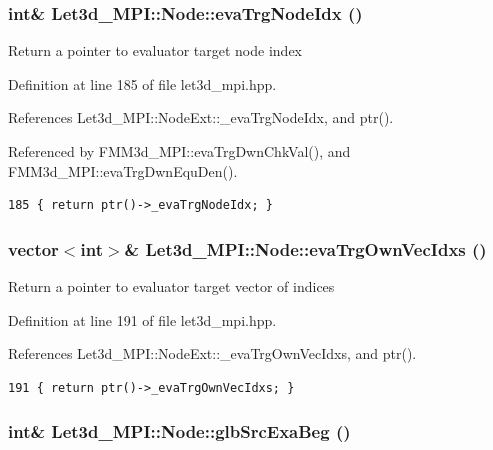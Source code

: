 \subsubsection{\setlength{\rightskip}{0pt plus 5cm}int\& Let3d\_\-MPI::Node::eva\-Trg\-Node\-Idx ()\hspace{0.3cm}{\tt  [inline]}}\label{classLet3d__MPI_1_1Node_b1477eecec8df181ec0697652f7729de_b1477eecec8df181ec0697652f7729de}


Return a pointer to evaluator target node index 

Definition at line 185 of file let3d\_\-mpi.hpp.

References Let3d\_\-MPI::Node\-Ext::\_\-eva\-Trg\-Node\-Idx, and ptr().

Referenced by FMM3d\_\-MPI::eva\-Trg\-Dwn\-Chk\-Val(), and FMM3d\_\-MPI::eva\-Trg\-Dwn\-Equ\-Den().

\footnotesize\begin{verbatim}185 { return ptr()->_evaTrgNodeIdx; }
\end{verbatim}\normalsize 


\subsubsection{\setlength{\rightskip}{0pt plus 5cm}vector$<$int$>$\& Let3d\_\-MPI::Node::eva\-Trg\-Own\-Vec\-Idxs ()\hspace{0.3cm}{\tt  [inline]}}\label{classLet3d__MPI_1_1Node_e206134bdf1e5eb4bc7bf02bbc2d5f57_e206134bdf1e5eb4bc7bf02bbc2d5f57}


Return a pointer to evaluator target vector of indices 

Definition at line 191 of file let3d\_\-mpi.hpp.

References Let3d\_\-MPI::Node\-Ext::\_\-eva\-Trg\-Own\-Vec\-Idxs, and ptr().

\footnotesize\begin{verbatim}191 { return ptr()->_evaTrgOwnVecIdxs; }
\end{verbatim}\normalsize 


\subsubsection{\setlength{\rightskip}{0pt plus 5cm}int\& Let3d\_\-MPI::Node::glb\-Src\-Exa\-Beg ()\hspace{0.3cm}{\tt  [inline]}}\label{classLet3d__MPI_1_1Node_9ea6714747312814b779525641871fc9_9ea6714747312814b779525641871fc9}


